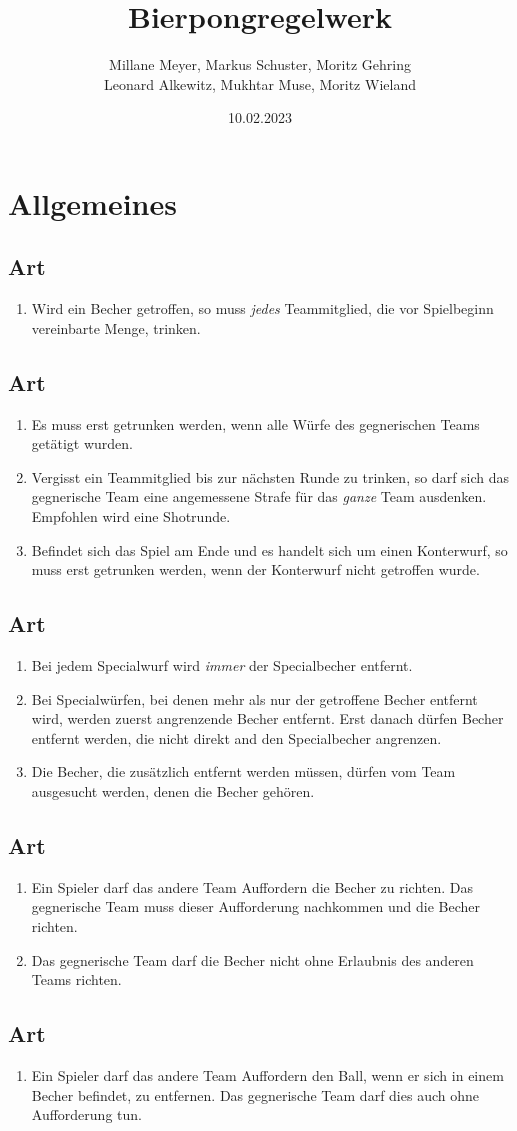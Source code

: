 \documentclass[a4paper,11pt]{scrartcl}
\title{\Huge{Bierpongregelwerk}}
\author{Millane Meyer, Markus Schuster, Moritz Gehring \\Leonard Alkewitz, Mukhtar Muse, Moritz Wieland}
\date{\small{10.02.2023}}
\newcommand{\enum}[1]{\begin{enumerate}[label=(\arabic*)]#1\end{enumerate}}
\newcommand{\art}[2]{\subsection*{#1} \enum{#2}}
\newcounter{art}
\begin{document}
\maketitle
\vspace*{-1cm}
\newpage

\section{Allgemeines}

\art{Art \theart}{
    \item
        Wird ein Becher getroffen, so muss \emph{jedes} Teammitglied, die vor Spielbeginn vereinbarte Menge, trinken.
}

\art{Art \theart}{
    \item
        Es muss erst getrunken werden, wenn alle Würfe des gegnerischen Teams getätigt wurden.
    \item
        Vergisst ein Teammitglied bis zur nächsten Runde zu trinken, so darf sich das gegnerische Team eine angemessene Strafe für das \emph{ganze} Team ausdenken. Empfohlen wird eine Shotrunde.
    \item
        Befindet sich das Spiel am Ende und es handelt sich um einen Konterwurf, so muss erst getrunken werden, wenn der Konterwurf nicht getroffen wurde.
}

\art{Art \theart}{
    \item
        Bei jedem Specialwurf wird \emph{immer} der Specialbecher entfernt.
    \item
        Bei Specialwürfen, bei denen mehr als nur der getroffene Becher entfernt wird, werden zuerst angrenzende Becher entfernt. Erst danach dürfen Becher entfernt werden, die nicht direkt and den Specialbecher angrenzen.
    \item
        Die Becher, die zusätzlich entfernt werden müssen, dürfen vom Team ausgesucht werden, denen die Becher gehören.
}

\art{Art \theart}{
    \item
        Ein Spieler darf das andere Team Auffordern die Becher zu richten. Das gegnerische Team muss dieser Aufforderung nachkommen und die Becher richten.
    \item
        Das gegnerische Team darf die Becher nicht ohne Erlaubnis des anderen Teams richten.
}

\art{Art \theart}{
    \item
        Ein Spieler darf das andere Team Auffordern den Ball, wenn er sich in einem Becher befindet, zu entfernen. Das gegnerische Team darf dies auch ohne Aufforderung tun.
}
\end{document}
